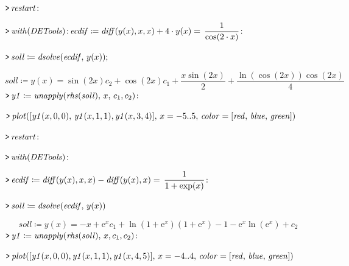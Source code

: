 \documentclass{article}
\begin{document}
{}
\mapleinput
{$ \displaystyle \texttt{>\,} \mathit{restart} \colon  $}

\mapleinput
{$ \displaystyle \texttt{>\,} \mathit{with} (\mathit{DETools})\colon 
\\
 \,\mathit{ecdif} \coloneqq \mathit{diff} (y (x),x ,x)+4\cdot y (x)=\,\frac{1}{\cos (2\cdot x)}\colon  $}

\mapleinput
{$ \displaystyle \texttt{>\,} \mathit{soll} \coloneqq \mathit{dsolve} (\mathit{ecdif} ,\,y (x)); $}

\begin{dmath}\label{(18)}
\mathit{soll} \coloneqq y \! \left(x \right)=\sin \! \left(2 x \right) c_{2}+\cos \! \left(2 x \right) c_{1}+\frac{x \sin \! \left(2 x \right)}{2}+\frac{\ln \! \left(\cos \! \left(2 x \right)\right) \cos \! \left(2 x \right)}{4}
\end{dmath}
\mapleinput
{$ \displaystyle \texttt{>\,} \mathit{y1} \coloneqq \mathit{unapply} (\mathit{rhs} (\mathit{soll}),\,x ,\,c_{1},c_{2})\colon  $}

\mapleinput
{$ \displaystyle \texttt{>\,} \mathit{plot} ([\mathit{y1} (x ,0,0),\,\mathit{y1} (x ,1,1),\mathit{y1} (x ,3,4)],\,x =-5..5,\,\mathit{color} =[\mathit{red} ,\,\mathit{blue} ,\,\mathit{green}]) $}

{}
\mapleinput
{$ \displaystyle \texttt{>\,} \mathit{restart} \colon  $}

\mapleinput
{$ \displaystyle \texttt{>\,} \mathit{with} (\mathit{DETools})\colon  $}

\mapleinput
{$ \displaystyle \texttt{>\,} \mathit{ecdif} \coloneqq \mathit{diff} (y (x),x ,x)-\mathit{diff} (y (x),x)=\,\frac{1}{1+\exp (x)}\colon  $}

\mapleinput
{$ \displaystyle \texttt{>\,} \mathit{soll} \coloneqq \mathit{dsolve} (\mathit{ecdif} ,\,y (x)) $}

\begin{dmath}\label{(19)}
\mathit{soll} \coloneqq y \! \left(x \right)=-x +{\mathrm e}^{x} c_{1}+\ln \! \left(1+{\mathrm e}^{x}\right) \left(1+{\mathrm e}^{x}\right)-1-{\mathrm e}^{x} \ln \! \left({\mathrm e}^{x}\right)+c_{2}
\end{dmath}
\mapleinput
{$ \displaystyle \texttt{>\,} \mathit{y1} \coloneqq \mathit{unapply} (\mathit{rhs} (\mathit{soll}),\,x ,c_{1},c_{2})\colon  $}

\mapleinput
{$ \displaystyle \texttt{>\,} \mathit{plot} ([\mathit{y1} (x ,0,0),\mathit{y1} (x ,1,1),\mathit{y1} (x ,4,5)],\,x =-4..4,\,\mathit{color} =[\mathit{red} ,\,\mathit{blue} ,\,\mathit{green}]) $}
\end{document}
